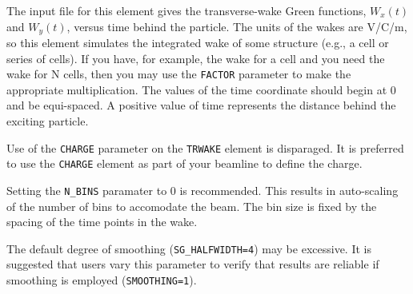 The input file for this element gives the transverse-wake Green
functions, $W_x(t)$ and $W_y(t)$, versus time behind the particle. The
units of the wakes are V/C/m, so this element simulates the integrated
wake of some structure (e.g., a cell or series of cells).  If you
have, for example, the wake for a cell and you need the wake for N
cells, then you may use the {\tt FACTOR} parameter to make the
appropriate multiplication.  The values of the time coordinate should
begin at 0 and be equi-spaced.  A positive value of time represents
the distance behind the exciting particle.

Use of the {\tt CHARGE} parameter on the {\tt TRWAKE} element is
disparaged.  It is preferred to use the {\tt CHARGE} element as part
of your beamline to define the charge.  

Setting the {\tt N\_BINS} paramater to 0 is recommended.  This results
in auto-scaling of the number of bins to accomodate the beam.  The bin
size is fixed by the spacing of the time points in the wake.

The default degree of smoothing ({\tt SG\_HALFWIDTH=4}) may be excessive.
It is suggested that users vary this parameter to verify that results
are reliable if smoothing is employed ({\tt SMOOTHING=1}).

